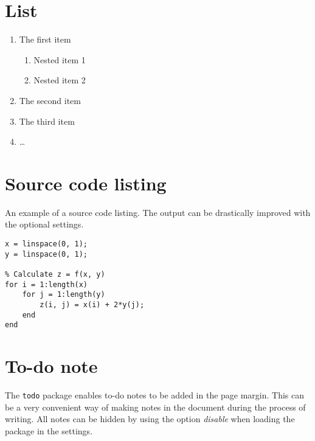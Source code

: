 \section{List}
\begin{enumerate}
    \item The first item
    \begin{enumerate}
        \item Nested item 1
        \item Nested item 2
    \end{enumerate}
    \item The second item
    \item The third item
    \item \dots
\end{enumerate}

\section{Source code listing}
An example of a source code listing.
The output can be drastically improved with the optional settings.
\lstset{language=Matlab}
\begin{lstlisting}[frame=single]
% Generate x- and y-nodes
x = linspace(0, 1);
y = linspace(0, 1);

% Calculate z = f(x, y)
for i = 1:length(x)
    for j = 1:length(y)
        z(i, j) = x(i) + 2*y(j);
    end
end
\end{lstlisting}

\section{To-do note}
The \texttt{todo} package enables to-do notes to be added in the page margin. This can be a very convenient way of making notes in the document during the process of writing. All notes can be hidden by using the option \emph{disable} when loading the package in the settings. 
